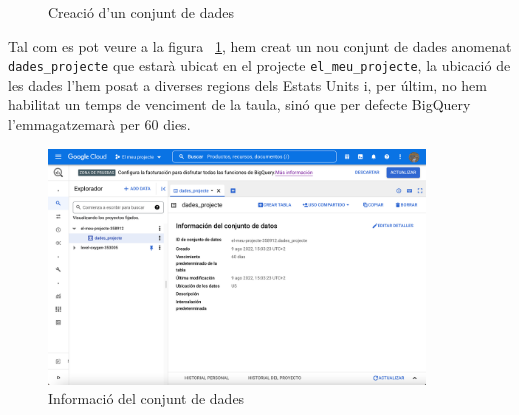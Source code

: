 \documentclass[11pt,longbibliography]{article}
\theoremstyle{definition}
\theoremstyle{remark}
\begin{document}
\begin{figure}[h!]
\par
{}%
\hfill
{}%
\par
\caption{Creació d'un conjunt de dades}
\label{fig:bq3}
\end{figure}


Tal com es pot veure a la figura ~\ref{fig:bq3}, hem creat un nou conjunt de dades anomenat \verb|dades_projecte| que estarà ubicat en el projecte \verb|el_meu_projecte|, la ubicació de les dades l'hem posat a diverses regions dels Estats Units i, per últim, no hem habilitat un temps de venciment de la taula, sinó que per defecte BigQuery l'emmagatzemarà per 60 dies.


\begin{figure}[h!]
\begin{center}
\includegraphics[width=10cm]{bq5}
\end{center}
\caption{Informació del conjunt de dades}
\label{fig:bq5}
\end{figure}
\end{document}
